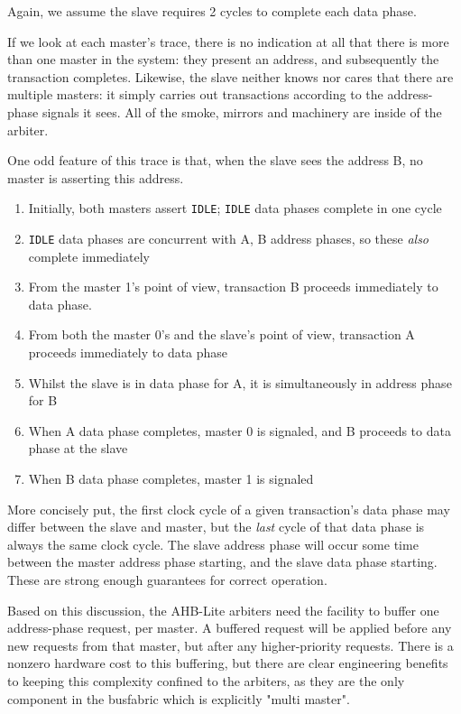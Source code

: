 \documentclass[notitlepage]{article}
\begin{document}
Again, we assume the slave requires 2 cycles to complete each data phase.

If we look at each master's trace, there is no indication at all that there is more than one master in the system: they present an address, and subsequently the transaction completes. Likewise, the slave neither knows nor cares that there are multiple masters: it simply carries out transactions according to the address-phase signals it sees. All of the smoke, mirrors and machinery are inside of the arbiter.

One odd feature of this trace is that, when the slave sees the address B, no master is asserting this address.

\begin{enumerate}
	\item Initially, both masters assert {\tt IDLE}; {\tt IDLE} data phases complete in one cycle
	\item {\tt IDLE} data phases are concurrent with A, B address phases, so these {\it also} complete immediately
	\item From the master 1's point of view, transaction B proceeds immediately to data phase.
	\item From both the master 0's and the slave's point of view, transaction A proceeds immediately to data phase
	\item Whilst the slave is in data phase for A, it is simultaneously in address phase for B
	\item When A data phase completes, master 0 is signaled, and B proceeds to data phase at the slave
	\item When B data phase completes, master 1 is signaled
\end{enumerate}

More concisely put, the first clock cycle of a given transaction's data phase may differ between the slave and master, but the {\it last} cycle of that data phase is always the same clock cycle. The slave address phase will occur some time between the master address phase starting, and the slave data phase starting. These are strong enough guarantees for correct operation.

Based on this discussion, the AHB-Lite arbiters need the facility to buffer one address-phase request, per master. A buffered request will be applied before any new requests from that master, but after any higher-priority requests. There is a nonzero hardware cost to this buffering, but there are clear engineering benefits to keeping this complexity confined to the arbiters, as they are the only component in the busfabric which is explicitly "multi master".
\end{document}
